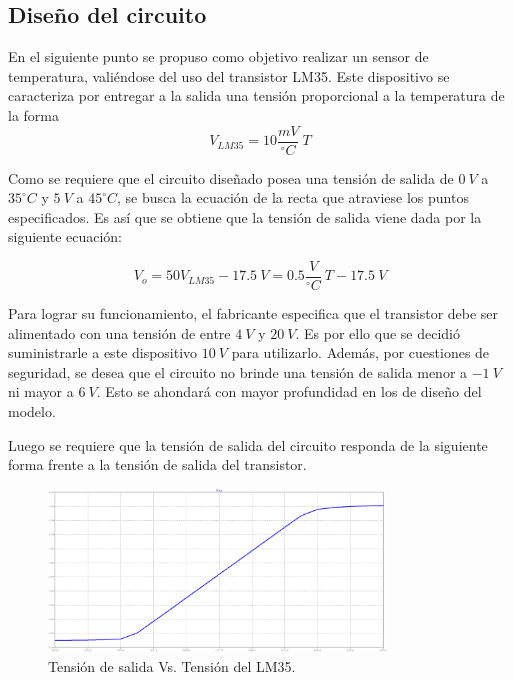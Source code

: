 \documentclass[a4paper]{article}
\begin{document}
\subsection{Diseño del circuito}

En el siguiente punto se propuso como objetivo realizar un sensor de temperatura, valiéndose del uso del transistor LM35. Este dispositivo se caracteriza por entregar a la salida una tensión proporcional a la temperatura de la forma
\[
	V_{LM35} = 10 \frac{mV}{^{\circ}C} \ T
\]

Como se requiere que el circuito diseñado posea una tensión de salida de $ 0 \ V $ a $ 35 ^{\circ}C $ y $ 5 \ V $ a $ 45 ^{\circ}C $, se busca la ecuación de la recta que atraviese los puntos especificados. Es así que se obtiene que la tensión de salida viene dada por la siguiente ecuación:

\begin{equation}
	V_{o} = 50V_{LM35} - 17.5 \ V =  0.5 \frac{V}{^{\circ}C} \ T - 17.5 \ V
	\label{equ:sistema}
\end{equation}

Para lograr su funcionamiento, el fabricante especifica que el transistor debe ser alimentado con una tensión de entre $4 \ V$ y $20 \ V$. Es por ello que se decidió suministrarle a este dispositivo $10 \ V$ para utilizarlo. Además, por cuestiones de seguridad, se desea que el circuito no brinde una tensión de salida menor a $-1 \ V$ ni mayor a $6 \ V$. Esto se ahondará con mayor profundidad en los de diseño del modelo.

Luego se requiere que la tensión de salida del circuito responda de la siguiente forma frente a la tensión de salida del transistor.

\begin{figure}[H]
	\centering
	\includegraphics[width=0.8\textwidth]{Ejercicio6/Imagenes/SalidaVsVLM35.png}
\caption{Tensión de salida Vs. Tensión del LM35.}
	\label{fig:vout}
\end{figure}
\end{document}
